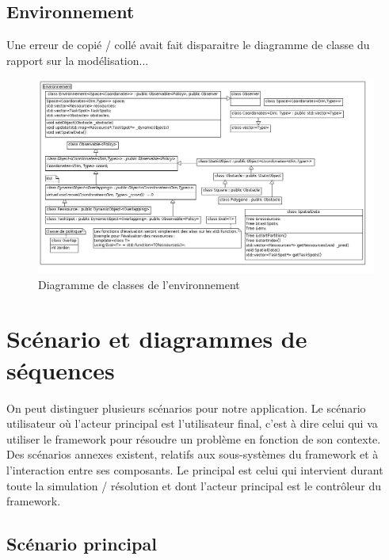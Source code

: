 \newpage
\subsection{{\color{blue}Environnement}}
Une erreur de copié / collé avait fait disparaitre le diagramme de classe du rapport sur la modélisation...
\begin{figure}[!h]\centering
   \includegraphics[angle=90, scale=0.5]{images/c_environnement.png}
   \caption{\label{c_ia_contraintes} Diagramme de classes de l'environnement}
\end{figure}

%
\newpage
\section{Scénario et diagrammes de séquences}

On peut distinguer plusieurs scénarios pour notre application. Le scénario utilisateur où l'acteur principal est l'utilisateur final, c'est à dire celui qui va utiliser le framework pour résoudre un problème en fonction de son contexte.\\

Des scénarios annexes existent, relatifs aux sous-systèmes du framework et à l’interaction entre ses composants. Le principal est celui qui intervient durant toute la simulation / résolution et dont l'acteur principal est le contrôleur du framework.

\subsection{Scénario principal}

